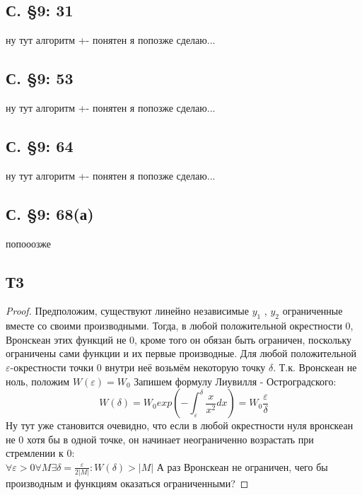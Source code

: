 \documentclass{article}
\begin{document}
\subsection{С. \S9: 31 }
ну тут алгоритм +- понятен я попозже сделаю...
\subsection{С. \S9: 53 }
ну тут алгоритм +- понятен я попозже сделаю...
\subsection{С. \S9: 64 }
ну тут алгоритм +- понятен я попозже сделаю...
\subsection{С. \S9: 68(а)}
попооозже
\subsection{Т3} 
\begin{proof}
Предположим, существуют линейно независимые $y_1$ , $y_2$ ограниченные вместе со своими производными. Тогда, в любой положительной окрестности 0, Вронскеан этих функций не 0, кроме того он обязан быть ограничен, поскольку ограничены сами функции и их первые производные. Для любой положительной $\varepsilon$-окрестности точки 0 внутри неё возьмём некоторую точку $\delta$. Т.к. Вронскеан не ноль, положим $W(\varepsilon)=W_0$ Запишем формулу Лиувилля - Остроградского:
\begin{equation}
    W(\delta)=W_0 exp \left(- \int^{\delta}_{\varepsilon} \frac{x}{x^2} dx  \right) = W_0 \frac{\varepsilon}{\delta}
\end{equation}
Ну тут уже становится очевидно, что если в любой окрестности нуля вронскеан не 0 хотя бы в одной точке, он начинает неограниченно возрастать при стремлении к 0:\\
$\forall  \varepsilon > 0 \forall M \exists \delta =  \frac{\varepsilon}{2|M|}: W(\delta)>|M|$
А раз Вронскеан не ограничен, чего бы производным и функциям оказаться ограниченными?
\end{proof}
\end{document}
